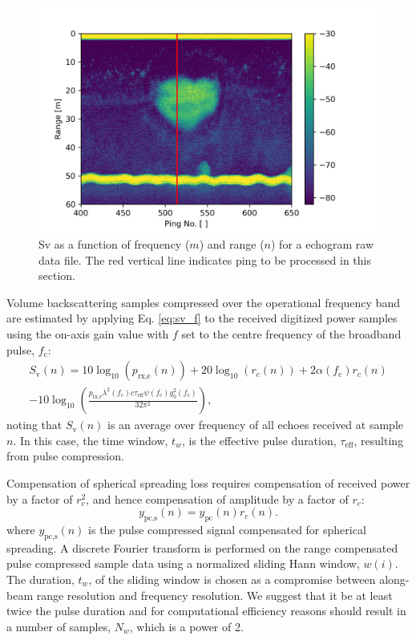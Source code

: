 \documentclass[preprint,12pt,TurnOnLineNumbers]{JASAnew}
\newcommand{\samplesymt}{n}
\newcommand{\genidxsym}{i}
\newcommand{\fc}{f_{\textrm{c}}}
\newcommand{\ptxe}{p_{\textrm{tx,e}}}
\newcommand{\prxe}{p_{\textrm{rx,e}}}
\newcommand{\teff}{\tau_{\textrm{eff}}}
\newcommand{\ypc}{y_{\textrm{pc}}}
\newcommand{\ypcspread}{y_{\textrm{pc,s}}}
\newcommand{\hannw}{w}
\newcommand{\nw}{N_{\hannw}}
\newcommand{\tslide}{t_w}
\newcommand{\sv}{S_{\textrm{v}}}
\newcommand{\range}{r}
\newcommand{\gainzero}{g_0}
\newcommand{\eqang}{\psi}
\newcommand{\wlen}{\lambda}
\newcommand{\cw}{c}
\newcommand{\absorp}{\alpha}
\begin{document}
\begin{figure}
\includegraphics[width=16cm]{Fig_Sv_echogram}
\caption{\label{Fig_Sv_echogram} Sv as a function of frequency ($m$) and range ($n$) for a echogram raw data file. The red vertical line indicates ping to be processed in this section.}
\end{figure}

Volume backscattering samples compressed over the operational frequency band are estimated by applying Eq. \ref{eq:sv_f} to the received digitized power samples using the on-axis gain value with $f$ set to the centre frequency of the broadband pulse, $\fc$:
\begin{equation}
\label{eq:Sv}
\begin{split}
\sv(\samplesymt)  =  10\log_{10}(\prxe(\samplesymt)) + 20\log_{10}(\range_c(\samplesymt)) + 2\absorp(\fc)\range_c(\samplesymt) \\
- 10\log_{10}\left( \frac{\ptxe \wlen^2(\fc) \cw \teff \eqang(\fc) \gainzero^2(\fc)}{32\pi^2} \right),
\end{split}
\end{equation}
noting that $\sv(\samplesymt)$ is an average over frequency of all echoes received at sample $\samplesymt$. In this case, the time window, $\tslide$, is the effective pulse duration, $\teff$, resulting from pulse compression.

Compensation of spherical spreading loss requires compensation of received power by a factor of $r_c^2$, and hence compensation of amplitude by a factor of $\range_c$:
%
\begin{equation}
\label{eq:spreadcomp}
\ypcspread(\samplesymt) = \ypc(\samplesymt)\range_c(\samplesymt).
\end{equation}
%
where $\ypcspread(\samplesymt)$ is the pulse compressed signal compensated for spherical spreading. A discrete Fourier transform is performed on the range compensated pulse compressed sample data using a normalized sliding Hann window, $\hannw(\genidxsym)$. The duration, $\tslide$, of the sliding window is chosen as a compromise between along-beam range resolution and frequency resolution. We suggest that it be at least twice the pulse duration and for computational efficiency reasons should result in a number of samples, $\nw$, which is a power of 2.
\end{document}
